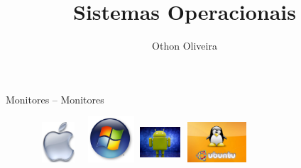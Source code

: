 \documentclass[11pt]{beamer}
\author{Othon Oliveira}
\title{Sistemas Operacionais}
\institute{Fatec -- Faculdade de Informática --- PE}
\begin{document}
\newcommand{\capa}{
    \begin{tikzpicture}[remember picture,overlay]
        \node at (current page.south west)
            {\begin{tikzpicture}[remember picture, overlay]
                \fill[shading=radial,top color=orange,bottom color=orange,middle color=yellow] (0,0) rectangle (\paperwidth,\paperheight);
            \end{tikzpicture}
          };
    \end{tikzpicture}
}




\begin{frame}
\titlepage
\end{frame}

\begin{frame}{Monitores -- Monitores}
\begin{figure}[h]
\includegraphics[width=18mm, height=15mm]{Figuras/appleOficial.jpg}
\qquad \quad \quad \quad \quad
\includegraphics[width=19mm, height=17mm]{Figuras/windows.png}
\qquad \quad \quad \quad \quad \quad \quad 	\vspace{1.0in}
\includegraphics[width=15mm, height=15mm]{Figuras/android.jpg}
\qquad \quad \quad \quad \quad \quad \quad \quad 
\includegraphics[width=25mm, height=15mm]{Figuras/ubuntu_904.jpg}

\end{figure}
\end{frame}


\begin{frame}
\tableofcontents
\end{frame}
\end{document}
